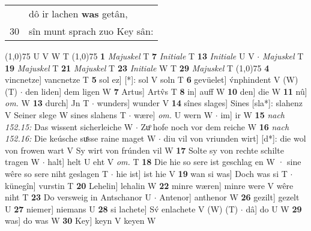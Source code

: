 \documentclass[8pt,a4paper,notitlepage]{article}
\begin{document}
\begin{table}[ht]
\begin{minipage}[t]{0.5\linewidth}
\begin{tabular}{rl}
 & dô ir lachen \textbf{was} getân,\\ 
30 & sîn munt sprach zuo Key sân:\\ 
\end{tabular}
\scriptsize
\line(1,0){75} \newline
U V W T \newline
\line(1,0){75} \newline
\textbf{1} \textit{Majuskel} T  \textbf{7} \textit{Initiale} T  \textbf{13} \textit{Initiale} U V   $\cdot$ \textit{Majuskel} T  \textbf{19} \textit{Majuskel} T  \textbf{21} \textit{Majuskel} T  \textbf{23} \textit{Initiale} W T  \textbf{29} \textit{Majuskel} T  \newline
\line(1,0){75} \newline
\textbf{4} vincnetze] vancnetze T \textbf{5} sol ez] [*]: sol V soln T \textbf{6} gevüelet] v́nphindent V (W) (T)  $\cdot$ den liden] dem ligen W \textbf{7} Artus] Artv̂s T \textbf{8} in] auff W \textbf{10} den] die W \textbf{11} nû] \textit{om.} W \textbf{13} durch] Jn T  $\cdot$ wunders] wunder V \textbf{14} sînes slages] Sines [sla*]: slahenz V Seiner slege W sines slahens T  $\cdot$ wære] \textit{om.} U wern W  $\cdot$ im] ir W \textbf{15} \textit{nach 152.15:} Das wissent sicherleiche W   $\cdot$ Zuͦ hofe noch vor dem reiche W \textbf{16} \textit{nach 152.16:} Die keúsche suͤsse raine maget W   $\cdot$ diu vil von vriunden wirt] [d*]: die wol von frowen wart V Sy wirt von frúnden vil W \textbf{17} Solte sy von rechte schilte tragen W  $\cdot$ halt] helt U eht V \textit{om.} T \textbf{18} Die hie so sere ist geschlag en W · sine wêre so sere niht geslagen T  $\cdot$ hie ist] ist hie V \textbf{19} wan si was] Doch was si T  $\cdot$ künegîn] vurstin T \textbf{20} Lehelin] lehalin W \textbf{22} minre wæren] minre were V wêre niht T \textbf{23} Do versweig in Antschanor U  $\cdot$ Antenor] anthenor W \textbf{26} gezilt] gezelt U \textbf{27} niemer] niemans U \textbf{28} si lachete] Sv́ enlachete V (W) (T)  $\cdot$ dâ] do U W \textbf{29} was] do was W \textbf{30} Key] keyn V keyen W \newline
\end{minipage}
\end{table}
\end{document}
